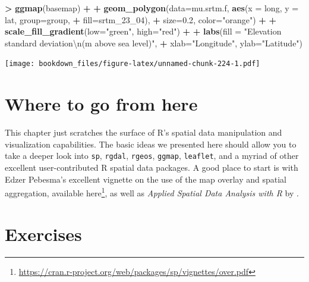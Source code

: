 \documentclass[
]{krantz}
\makeatletter
\newenvironment{Shaded}{\begin{snugshade}}{\end{snugshade}}
\newcommand{\CharTok}[1]{\textcolor[rgb]{0.5,0.5,0.5}{#1}}
\newcommand{\DataTypeTok}[1]{\textcolor[rgb]{0.27,0.27,0.27}{#1}}
\newcommand{\DecValTok}[1]{\textcolor[rgb]{0.06,0.06,0.06}{#1}}
\newcommand{\FloatTok}[1]{\textcolor[rgb]{0.06,0.06,0.06}{#1}}
\newcommand{\KeywordTok}[1]{\textcolor[rgb]{0.27,0.27,0.27}{\textbf{#1}}}
\newcommand{\NormalTok}[1]{#1}
\newcommand{\OperatorTok}[1]{\textcolor[rgb]{0.43,0.43,0.43}{\textbf{#1}}}
\newcommand{\StringTok}[1]{\textcolor[rgb]{0.5,0.5,0.5}{#1}}
\renewcommand{\href}[2]{#2\footnote{\url{#1}}}
\newenvironment{kframe}{%
\medskip{}
\setlength{\fboxsep}{.8em}
 \def\at@end@of@kframe{}%
 \ifinner\ifhmode%
  \def\at@end@of@kframe{\end{minipage}}%
  \begin{minipage}{\columnwidth}%
 \fi\fi%
 \def\FrameCommand##1{\hskip\@totalleftmargin \hskip-\fboxsep
 \colorbox{shadecolor}{##1}\hskip-\fboxsep
     \hskip-\linewidth \hskip-\@totalleftmargin \hskip\columnwidth}%
 \MakeFramed {\advance\hsize-\width
   \@totalleftmargin\z@ \linewidth\hsize
   \@setminipage}}%
 {\par\unskip\endMakeFramed%
 \at@end@of@kframe}
\renewenvironment{Shaded}{\begin{kframe}}{\end{kframe}}
\makeatother
\begin{document}
\begin{Shaded}
\begin{Highlighting}[]
\OperatorTok{\textgreater{}}\StringTok{ }\KeywordTok{ggmap}\NormalTok{(basemap) }\OperatorTok{+}
\OperatorTok{+}\StringTok{     }\KeywordTok{geom\_polygon}\NormalTok{(}\DataTypeTok{data=}\NormalTok{mu.srtm.f, }\KeywordTok{aes}\NormalTok{(}\DataTypeTok{x =}\NormalTok{ long, }\DataTypeTok{y =}\NormalTok{ lat, }\DataTypeTok{group=}\NormalTok{group, }
\OperatorTok{+}\StringTok{                                      }\DataTypeTok{fill=}\NormalTok{srtm\_}\DecValTok{23}\NormalTok{\_}\DecValTok{04}\NormalTok{), }
\OperatorTok{+}\StringTok{                  }\DataTypeTok{size=}\FloatTok{0.2}\NormalTok{, }\DataTypeTok{color=}\StringTok{"orange"}\NormalTok{) }\OperatorTok{+}
\OperatorTok{+}\StringTok{     }\KeywordTok{scale\_fill\_gradient}\NormalTok{(}\DataTypeTok{low=}\StringTok{"green"}\NormalTok{, }\DataTypeTok{high=}\StringTok{"red"}\NormalTok{) }\OperatorTok{+}
\OperatorTok{+}\StringTok{         }\KeywordTok{labs}\NormalTok{(}\DataTypeTok{fill =} \StringTok{"Elevation standard deviation}\CharTok{\textbackslash{}n}\StringTok{(m above sea level)"}\NormalTok{, }
\OperatorTok{+}\StringTok{          }\DataTypeTok{xlab=}\StringTok{"Longitude"}\NormalTok{, }\DataTypeTok{ylab=}\StringTok{"Latitude"}\NormalTok{)}
\end{Highlighting}
\end{Shaded}

\texttt{[image: bookdown\_files/figure-latex/unnamed-chunk-224-1.pdf]}

\hypertarget{where-to-go-from-here}{%
\section{Where to go from here}\label{where-to-go-from-here}}

This chapter just scratches the surface of R's spatial data manipulation and visualization capabilities. The basic ideas we presented here should allow you to take a deeper look into \texttt{sp}, \texttt{rgdal}, \texttt{rgeos}, \texttt{ggmap}, \texttt{leaflet}, and a myriad of other excellent user-contributed R spatial data packages. A good place to start is with Edzer Pebesma's excellent vignette on the use of the map overlay and spatial aggregation, available \href{https://cran.r-project.org/web/packages/sp/vignettes/over.pdf}{here}, as well as \emph{Applied Spatial Data Analysis with R} by \cite{Bivand13}.

\hypertarget{exercises-5}{%
\section{Exercises}\label{exercises-5}}
\end{document}
